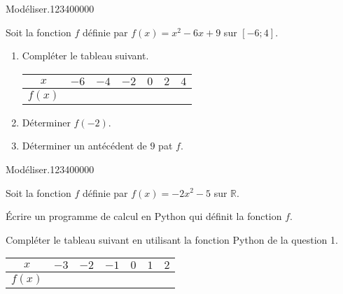\begin{pageAD} 

 
\begin{ExoCad}{Modéliser.}{1234}{0}{0}{0}{0}{0}

Soit la fonction $f$ définie par $f(x)=x^2-6x+9$ sur $[-6;4]$.  

\begin{enumerate}
\item Compléter le tableau suivant.

\begin{tabular}{|c|c|c|c|c|c|c|}
\hline 
$x$ & $-6$ &  $-4$ &  $-2$ &  $0$ &  $2$ &  $4$ \\ 
\hline 
$f(x)$ &   &   &   &  &  &   \\ 
\hline 
\end{tabular} 
\item Déterminer $f(-2)$.

\item Déterminer un antécédent de $9$ pat $f$.

\end{enumerate}


\end{ExoCad}




\begin{ExoCad}{Modéliser.}{1234}{0}{0}{0}{0}{0}

Soit la fonction $f$ définie par $f(x)=-2x^2-5$ sur $\mathbb R$. 

 
\begin{enumerate}[leftmargin=*]
\begin{minipage}[t]{0.48\linewidth}

\item Écrire un programme de calcul en Python qui définit la fonction $f$.

\end{minipage}
\hfill
\begin{minipage}[t]{0.48\linewidth}
\item Compléter le tableau suivant en utilisant la fonction Python de la question 1.

\begin{tabular}{|c|c|c|c|c|c|c|}
\hline 
$x$ & $-3$ &  $-2$ &  $-1$ &  $0$ &  $1$ &  $2$ \\ 
\hline 
$f(x)$ &   &   &   &  &  &   \\ 
\hline 
\end{tabular} 
\end{minipage}
\end{enumerate}


\end{ExoCad}
\end{pageAD}
